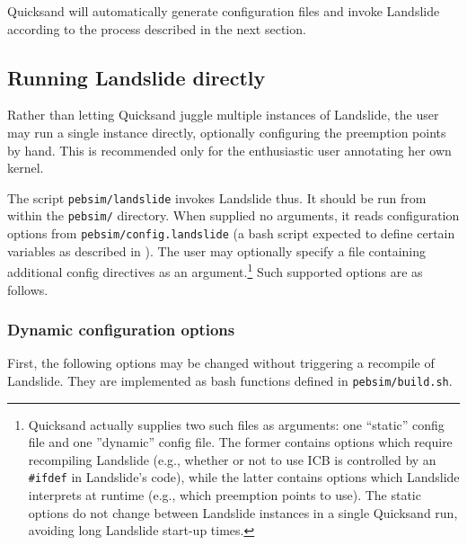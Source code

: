 Quicksand will automatically generate configuration files and invoke Landslide according to the process described in the next section.


\subsection{Running Landslide directly}
\label{sec:landslide-directly}

Rather than letting Quicksand juggle multiple instances of Landslide,
the user may run a single instance directly, optionally configuring the preemption points by hand.
This is recommended only for the enthusiastic user annotating her own kernel.

The script {\tt pebsim/landslide} invokes Landslide thus.
It should be run from within the {\tt pebsim/} directory.
When supplied no arguments, it reads configuration options from {\tt pebsim/config.landslide}
(a bash script expected to define certain variables as described in \sect{\ref{sec:landslide-glue}}).
The user may optionally specify a file containing additional config directives
as an argument.\footnote{
Quicksand actually supplies two such files as arguments: one ``static'' config file and one ''dynamic'' config file.
The former contains options which require recompiling Landslide (e.g., whether or not to use ICB is controlled by an {\tt \#ifdef} in Landslide's code),
while the latter contains options which Landslide interprets at runtime (e.g., which preemption points to use).
The static options do not change between Landslide instances in a single Quicksand run,
avoiding long Landslide start-up times.
}
Such supported options are as follows.

\subsubsection{Dynamic configuration options}
\label{sec:landslide-dynamicconfig}

First, the following options may be changed without triggering a recompile of Landslide.
They are implemented as bash functions defined in {\tt pebsim/build.sh}.

